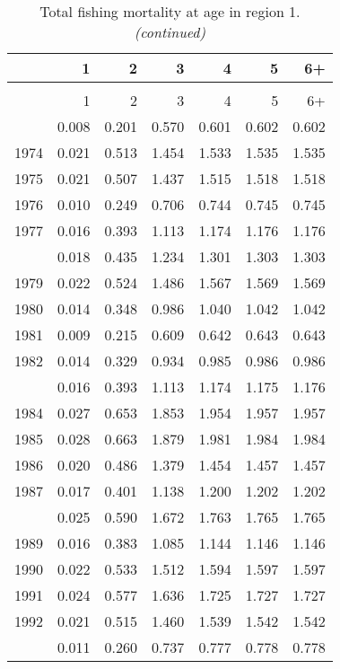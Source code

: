 \documentclass[
]{article}
\begin{document}
\begin{longtable}[t]{lrrrrrr}
\caption{\label{tab:region_1-region-FAA-table}Total fishing mortality at age in region 1.}\\
\toprule
  & 1 & 2 & 3 & 4 & 5 & 6+\\
\midrule
\endfirsthead
\caption[]{Total fishing mortality at age in region 1. \textit{(continued)}}\\
\toprule
  & 1 & 2 & 3 & 4 & 5 & 6+\\
\midrule
\endhead

\endfoot
\bottomrule
\endlastfoot
1973 & 0.008 & 0.201 & 0.570 & 0.601 & 0.602 & 0.602\\
1974 & 0.021 & 0.513 & 1.454 & 1.533 & 1.535 & 1.535\\
1975 & 0.021 & 0.507 & 1.437 & 1.515 & 1.518 & 1.518\\
1976 & 0.010 & 0.249 & 0.706 & 0.744 & 0.745 & 0.745\\
1977 & 0.016 & 0.393 & 1.113 & 1.174 & 1.176 & 1.176\\
\addlinespace
1978 & 0.018 & 0.435 & 1.234 & 1.301 & 1.303 & 1.303\\
1979 & 0.022 & 0.524 & 1.486 & 1.567 & 1.569 & 1.569\\
1980 & 0.014 & 0.348 & 0.986 & 1.040 & 1.042 & 1.042\\
1981 & 0.009 & 0.215 & 0.609 & 0.642 & 0.643 & 0.643\\
1982 & 0.014 & 0.329 & 0.934 & 0.985 & 0.986 & 0.986\\
\addlinespace
1983 & 0.016 & 0.393 & 1.113 & 1.174 & 1.175 & 1.176\\
1984 & 0.027 & 0.653 & 1.853 & 1.954 & 1.957 & 1.957\\
1985 & 0.028 & 0.663 & 1.879 & 1.981 & 1.984 & 1.984\\
1986 & 0.020 & 0.486 & 1.379 & 1.454 & 1.457 & 1.457\\
1987 & 0.017 & 0.401 & 1.138 & 1.200 & 1.202 & 1.202\\
\addlinespace
1988 & 0.025 & 0.590 & 1.672 & 1.763 & 1.765 & 1.765\\
1989 & 0.016 & 0.383 & 1.085 & 1.144 & 1.146 & 1.146\\
1990 & 0.022 & 0.533 & 1.512 & 1.594 & 1.597 & 1.597\\
1991 & 0.024 & 0.577 & 1.636 & 1.725 & 1.727 & 1.727\\
1992 & 0.021 & 0.515 & 1.460 & 1.539 & 1.542 & 1.542\\
\addlinespace
1993 & 0.011 & 0.260 & 0.737 & 0.777 & 0.778 & 0.778\\

\end{longtable}
\end{document}
